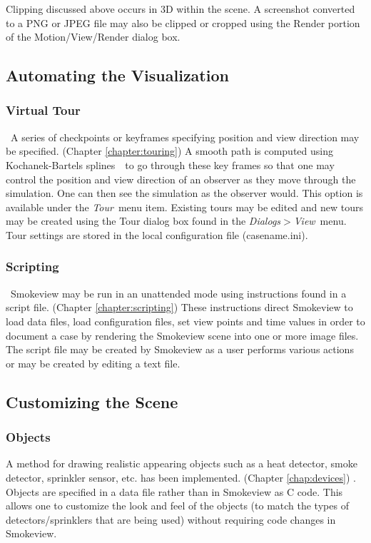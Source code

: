 \documentclass[11pt,twoside]{book}
\begin{document}
Clipping discussed above occurs in 3D within the scene.  A
screenshot converted to a PNG or JPEG file may also be clipped or
cropped using the Render portion of the Motion/View/Render
dialog box.

\subsection{Automating the Visualization}
\subsubsection{Virtual Tour}\   A series of checkpoints or keyframes
specifying position and view direction may be specified. (Chapter
\ref{chapter:touring}) A smooth path is computed using
Kochanek-Bartels splines~\cite{moller:02}\ to go through these key
frames so that one may control the position and view direction of
an observer as they move through the simulation. One can then see
the simulation as the observer would. This option is available
under the {\em Tour}\ menu item. Existing tours may be edited and
new tours may be created using the Tour dialog box found in
the {\em Dialogs$>$View}\ menu. Tour settings are stored in the local
configuration file (casename.ini).

\subsubsection{Scripting}\ Smokeview may be run in an unattended mode using
instructions found in a script file. (Chapter
\ref{chapter:scripting}) These instructions direct Smokeview to
load data files, load configuration files, set view points and
time values in order to document a case by rendering the Smokeview
scene into one or more image files. The script file may be created
by Smokeview as a user performs various actions or may be created
by editing a text file.

\subsection{Customizing the Scene}

\subsubsection{Objects}A method for drawing realistic appearing objects such as a heat detector,
smoke detector, sprinkler sensor, etc. has been implemented.
(Chapter \ref{chap:devices}) . Objects are specified in a data
file rather than in Smokeview as C code. This allows one to
customize the look and feel of the objects (to match the types of
detectors/sprinklers that are being used) without requiring code
changes in Smokeview.
\end{document}
